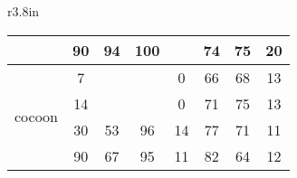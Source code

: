 \begin{wraptable}{r}{3.8in}
\begin{tabular}{c@{~}c|c@{~}c@{~}c|c@{~}c@{~}c}
                              & 90                                                   & 94        & 100     & \cellcolor[gray]{0.8}{100}       & 74         & 75       & 20      \\ \hline
 \multirow{4}{*}{cocoon}                             & 7                                                    & \cellcolor[gray]{0.8}{0}         & \cellcolor[gray]{0.8}{0}       & 0       & 66         & 68       & 13      \\ \cline{2-2}
                              & 14                                                   & \cellcolor[gray]{0.8}{0}         & \cellcolor[gray]{0.8}{0}       & 0       & 71         & 75       & 13      \\ \cline{2-2}
                              & 30                                                   & 53        & 96      & 14      & 77         & 71       & 11      \\ \cline{2-2}
                              & 90                                                   & 67        & 95      & 11      & 82         & 64       & 12      \\ \hline

\end{tabular}
\end{wraptable}
